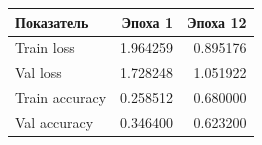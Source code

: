 \begin{tabular}{lrr}
\toprule
Показатель & Эпоха 1 & Эпоха 12 \\
\midrule
Train loss & 1.964259 & 0.895176 \\
Val loss & 1.728248 & 1.051922 \\
Train accuracy & 0.258512 & 0.680000 \\
Val accuracy & 0.346400 & 0.623200 \\
\bottomrule
\end{tabular}
